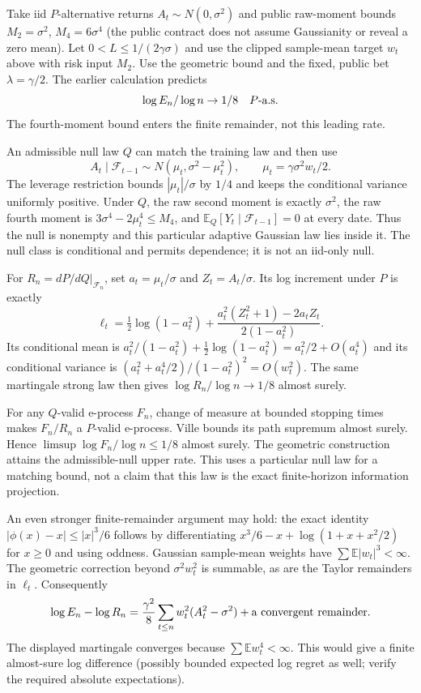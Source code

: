 Take iid $P$-alternative returns $A_t\sim N(0,\sigma^2)$ and public raw-moment
bounds $M_2=\sigma^2$, $M_4=6\sigma^4$ (the public contract does not assume
Gaussianity or reveal a zero mean). Let $0<L\le1/(2\gamma\sigma)$ and use
the clipped sample-mean target $w_t$ above with risk input $M_2$.
Use the geometric bound and the fixed, public bet $\lambda=\gamma/2$.
The earlier calculation predicts
\[
 \log E_n/\log n\to1/8\quad P\hbox{-a.s.}
\]
The fourth-moment bound enters the finite remainder, not this leading rate.

An admissible null law $Q$ can match the training law and then use
\[
 A_t\mid\mathcal F_{t-1}\sim
 N(\mu_t,\sigma^2-\mu_t^2),\qquad \mu_t=\gamma\sigma^2w_t/2.
\]
The leverage restriction bounds $|\mu_t|/\sigma$ by $1/4$ and keeps the
conditional variance uniformly positive. Under $Q$, the raw second moment
is exactly $\sigma^2$, the raw fourth moment is
$3\sigma^4-2\mu_t^4\le M_4$, and
$\mathbb E_Q[Y_t\mid\mathcal F_{t-1}]=0$ at every date. Thus the null is
nonempty and this particular adaptive Gaussian law lies inside it. The null
class is conditional and permits dependence; it is not an iid-only null.

For $R_n=dP/dQ|_{\mathcal F_n}$, set $a_t=\mu_t/\sigma$ and $Z_t=A_t/\sigma$.
Its log increment under $P$ is exactly
\[
 \ell_t=\tfrac12\log(1-a_t^2)
       +\frac{a_t^2(Z_t^2+1)-2a_t Z_t}{2(1-a_t^2)}.
\]
Its conditional mean is $a_t^2/(1-a_t^2)+\tfrac12\log(1-a_t^2)
=a_t^2/2+O(a_t^4)$ and its conditional variance is
$(a_t^2+a_t^4/2)/(1-a_t^2)^2=O(w_t^2)$.
The same martingale strong law then gives
$\log R_n/\log n\to1/8$ almost surely.

For any $Q$-valid e-process $F_n$, change of measure at bounded stopping
times makes $F_n/R_n$ a $P$-valid e-process. Ville bounds its path supremum
almost surely. Hence $\limsup\log F_n/\log n\le1/8$ almost surely.
The geometric construction attains the admissible-null upper rate. This uses
a particular null law for a matching bound, not a claim that this law is the
exact finite-horizon information projection.

An even stronger finite-remainder argument may hold: the exact identity
$|\phi(x)-x|\le|x|^3/6$ follows by differentiating
$x^3/6-x+\log(1+x+x^2/2)$ for $x\ge0$ and using oddness.
Gaussian sample-mean weights have $\sum\mathbb E|w_t|^3<\infty$.
The geometric correction beyond $\sigma^2w_t^2$ is summable, as are the
Taylor remainders in $\ell_t$. Consequently
\[
 \log E_n-\log R_n
  =\frac{\gamma^2}{8}\sum_{t\le n}w_t^2(A_t^2-\sigma^2)
       +\hbox{a convergent remainder}.
\]
The displayed martingale converges because $\sum\mathbb Ew_t^4<\infty$.
This would give a finite almost-sure log difference (possibly bounded
expected log regret as well; verify the required absolute expectations).

